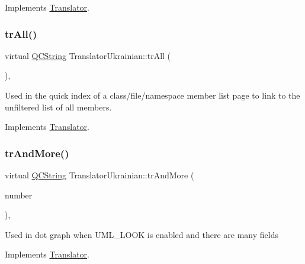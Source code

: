 Implements \mbox{\hyperlink{class_translator}{Translator}}.

\mbox{\label{class_translator_ukrainian_a063f16807522000089752805f1aa65cc}} 
\subsubsection{\texorpdfstring{trAll()}{trAll()}}
{\footnotesize\ttfamily virtual \mbox{\hyperlink{class_q_c_string}{Q\+C\+String}} Translator\+Ukrainian\+::tr\+All (\begin{DoxyParamCaption}{ }\end{DoxyParamCaption})\hspace{0.3cm}{\ttfamily [inline]}, {\ttfamily [virtual]}}

Used in the quick index of a class/file/namespace member list page to link to the unfiltered list of all members. 

Implements \mbox{\hyperlink{class_translator}{Translator}}.

\mbox{\label{class_translator_ukrainian_a82cf3218b9d254cc206fccec2c2ef0a9}} 
\subsubsection{\texorpdfstring{trAndMore()}{trAndMore()}}
{\footnotesize\ttfamily virtual \mbox{\hyperlink{class_q_c_string}{Q\+C\+String}} Translator\+Ukrainian\+::tr\+And\+More (\begin{DoxyParamCaption}\item[{const \mbox{\hyperlink{class_q_c_string}{Q\+C\+String}} \&}]{number }\end{DoxyParamCaption})\hspace{0.3cm}{\ttfamily [inline]}, {\ttfamily [virtual]}}

Used in dot graph when U\+M\+L\+\_\+\+L\+O\+OK is enabled and there are many fields 

Implements \mbox{\hyperlink{class_translator}{Translator}}.

\mbox{\label{class_translator_ukrainian_a06a64e1b8f3da17dade767f570fa2208}} 
